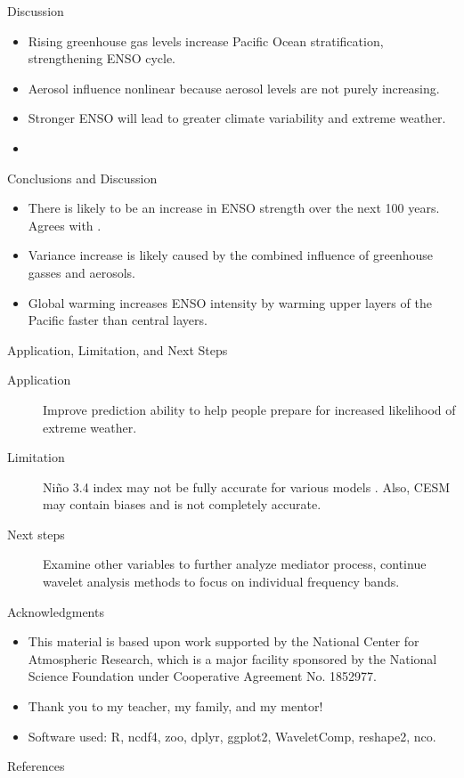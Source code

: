 \documentclass{beamer}
\begin{document}

\begin{frame}{Discussion}
  \begin{itemize}
  \item Rising greenhouse gas levels increase Pacific Ocean stratification, strengthening ENSO cycle.
  \item Aerosol influence nonlinear because aerosol levels are not purely increasing.
  \item Stronger ENSO will lead to greater climate variability and extreme weather.
  \item
  \end{itemize}
\end{frame}

\begin{frame}{Conclusions and Discussion}
  \begin{itemize}
  \item There is likely to be an increase in ENSO strength over the next 100 years. Agrees with \citet{cai2018increased}.
  \item Variance increase is likely caused by the combined influence of greenhouse gasses and aerosols.
  \item Global warming increases ENSO intensity by warming upper layers of the Pacific faster than central layers.
  \end{itemize}
\end{frame}

\begin{frame}{Application, Limitation, and Next Steps}
  \begin{description}
  \item[\alert{Application}] Improve prediction ability to help people prepare for increased likelihood of extreme weather.
  \item[\alert{Limitation}] Niño 3.4 index may not be fully accurate for various models \citep{cai2018increased}. Also, CESM may contain biases and is not completely accurate.
  \item[\alert{Next steps}] Examine other variables to further analyze mediator process, continue wavelet analysis methods to focus on individual frequency bands.
  \end{description}
\end{frame}

\begin{frame}{Acknowledgments}
  \begin{itemize}
  \item This material is based upon work supported by the National Center for Atmospheric Research, which is a major facility sponsored by the National Science Foundation under Cooperative Agreement No. 1852977.
  \item Thank you to my teacher, my family, and my mentor!
  \item Software used: R, ncdf4, zoo, dplyr, ggplot2, WaveletComp, reshape2, nco.
  \end{itemize}
\end{frame}

\begin{frame}{References}
  
  \fontsize{4pt}{5}\selectfont
  
\end{frame}
\end{document}
